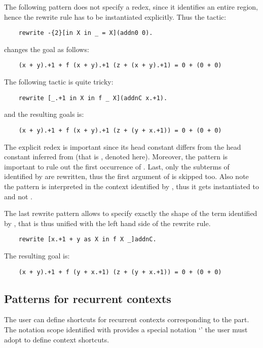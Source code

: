 The following pattern does not specify a redex, since it
identifies an entire region, hence the rewrite rule has to be instantiated
explicitly. Thus the tactic:
\begin{lstlisting}
    rewrite -{2}[in X in _ = X](addn0 0).
\end{lstlisting}
changes the goal as follows:
\begin{lstlisting}
    (x + y).+1 + f (x + y).+1 (z + (x + y).+1) = 0 + (0 + 0)
\end{lstlisting}
The following tactic is quite tricky:
\begin{lstlisting}
    rewrite [_.+1 in X in f _ X](addnC x.+1).
\end{lstlisting}
and the resulting goals is:
\begin{lstlisting}
    (x + y).+1 + f (x + y).+1 (z + (y + x.+1)) = 0 + (0 + 0)
\end{lstlisting}
The explicit redex  is important since its head
constant  differs from the head constant inferred from
 (that is , denoted \ssrC{+} here).
Moreover, the pattern  is important to rule out the first occurrence
of . Last, only the subterms of  identified by  are
rewritten, thus the first argument of  is skipped too.
Also note the pattern  is interpreted in the context
identified by , thus it gets instantiated to  and
not .

The last rewrite pattern allows to specify exactly the shape of the term
identified by , that is thus unified with the left hand side of the
rewrite rule.
\begin{lstlisting}
    rewrite [x.+1 + y as X in f X _]addnC.
\end{lstlisting}
The resulting goal is:
\begin{lstlisting}
    (x + y).+1 + f (y + x.+1) (z + (y + x.+1)) = 0 + (0 + 0)
\end{lstlisting}

\subsection{Patterns for recurrent contexts}

The user can define shortcuts for recurrent contexts corresponding to the
  {\term} part. The notation scope identified
with  provides a special notation `' the user
must adopt to define context shortcuts.


